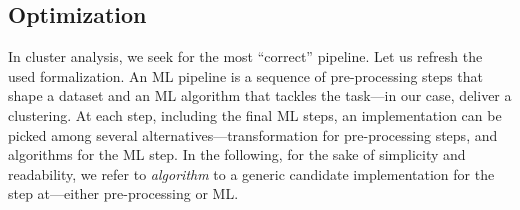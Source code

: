 



%
%
\subsection{Optimization}
\label{clustering-ssec:automl}

In cluster analysis, we seek for the most ``correct'' pipeline.
Let us refresh the used formalization.
An ML pipeline is a sequence of pre-processing steps that shape a dataset and an ML algorithm that tackles the task---in our case, deliver a clustering.
At each step, including the final ML steps, an implementation can be picked among several alternatives---transformation for pre-processing steps, and algorithms for the ML step.
In the following, for the sake of simplicity and readability, we refer to \textit{algorithm} to a generic candidate implementation for the step at---either pre-processing or ML.

